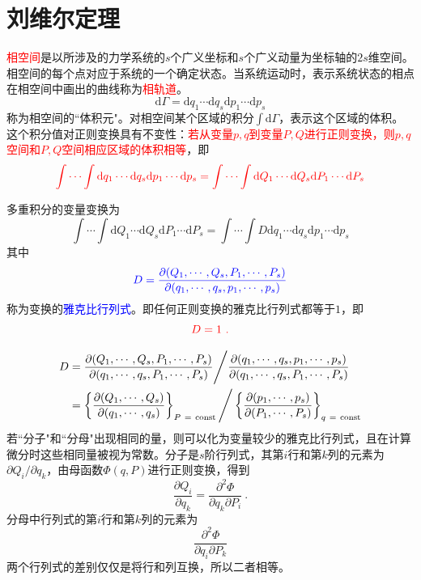 \documentclass[11pt,a4paper]{article}
\newcommand{\dif}{\mathrm{d}}
\begin{document}
\section{刘维尔定理}
\textcolor{red}{相空间}是以所涉及的力学系统的$s$个广义坐标和$s$个广义动量为坐标轴的$2s$维空间。相空间的每个点对应于系统的一个确定状态。当系统运动时，表示系统状态的相点在相空间中画出的曲线称为\textcolor{red}{相轨道}。
\begin{equation*}
\dif \Gamma = \dif q_1 \cdots \dif q_s \dif p_1 \cdots \dif p_s
\end{equation*}
称为相空间的``体积元"。对相空间某个区域的积分$\int \dif \Gamma$，表示这个区域的体积。这个积分值对正则变换具有不变性：\textcolor{red}{若从变量$p, q$到变量$P, Q$进行正则变换，则$p, q$空间和$P, Q$空间相应区域的体积相等}，即
\begin{equation}
\color{red} \int \cdots \int \dif q_1 \cdots \dif q_s \dif p_1 \cdots \dif p_s = \int \cdots \int \dif Q_1 \cdots \dif Q_s \dif P_1 \cdots \dif P_s
\end{equation}

多重积分的变量变换为
\begin{equation*}
\int \cdots \int \dif Q_1 \cdots \dif Q_s \dif P_1 \cdots \dif P_s = \int \cdots  \int D \dif q_1 \cdots \dif q_s \dif p_1 \cdots \dif p_s
\end{equation*}
其中
\begin{equation}
\color{blue} D  = \dfrac{\partial (Q_1, \cdots, Q_s, P_1, \cdots, P_s)}{\partial (q_1, \cdots, q_s, p_1, \cdots, p_s)}
\end{equation}
称为变换的\textcolor{blue}{雅克比行列式}。即任何正则变换的雅克比行列式都等于$1$，即
\begin{equation}
\color{red} D = 1 ~.
\end{equation}

\begin{align}
\nonumber D &= \dfrac{\partial (Q_1, \cdots, Q_s, P_1, \cdots, P_s)}{\partial (q_1, \cdots, q_s, P_1, \cdots, P_s)} \Bigg/ \dfrac{\partial (q_1, \cdots, q_s, p_1, \cdots, p_s)}{\partial (q_1, \cdots, q_s, P_1, \cdots, P_s)} \\
\nonumber &= \left\{ \dfrac{\partial (Q_1, \cdots, Q_s)}{\partial (q_1, \cdots, q_s)} \right\}_{P ~= ~\rm const} \Bigg/ \left\{\dfrac{\partial (p_1, \cdots, p_s)}{\partial (P_1, \cdots, P_s)} \right\}_{q~ = ~\rm const} 
\end{align}
若``分子"和``分母"出现相同的量，则可以化为变量较少的雅克比行列式，且在计算微分时这些相同量被视为常数。分子是$s$阶行列式，其第$i$行和第$k$列的元素为$\partial Q_i/\partial q_k$，由母函数$\Phi(q, P)$进行正则变换，得到
\begin{equation}
\dfrac{\partial Q_i}{\partial q_k} = \dfrac{\partial^2 \Phi}{\partial q_k \partial P_i} ~.
\end{equation}
分母中行列式的第$i$行和第$k$列的元素为
\begin{equation}
\dfrac{\partial^2 \Phi}{ \partial q_i \partial P_k}
\end{equation}
两个行列式的差别仅仅是将行和列互换，所以二者相等。
\end{document}
